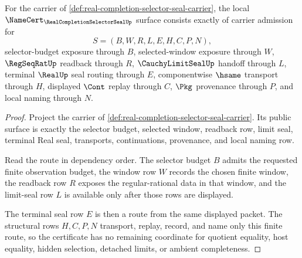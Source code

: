 \begin{theorem}
\label{thm:real-completion-selector-seal-namecert-obligations}
For the carrier of \autoref{def:real-completion-selector-seal-carrier}, the local $\NameCert_{\RealCompletionSelectorSealUp}$ surface consists exactly of carrier admission for
$$
S=(B,W,R,L,E,H,C,P,N),
$$
selector-budget exposure through $B$, selected-window exposure through $W$, $\RegSeqRatUp$ readback through $R$, $\CauchyLimitSealUp$ handoff through $L$, terminal $\RealUp$ seal routing through $E$, componentwise $\hsame$ transport through $H$, displayed $\Cont$ replay through $C$, $\Pkg$ provenance through $P$, and local naming through $N$.
\end{theorem}
\begin{proof}
Project the carrier of \autoref{def:real-completion-selector-seal-carrier}. Its public surface is exactly the selector budget, selected window, readback row, limit seal, terminal Real seal, transports, continuations, provenance, and local naming row.

Read the route in dependency order. The selector budget $B$ admits the requested finite observation budget, the window row $W$ records the chosen finite window, the readback row $R$ exposes the regular-rational data in that window, and the limit-seal row $L$ is available only after those rows are displayed.

The terminal seal row $E$ is then a route from the same displayed packet. The structural rows $H,C,P,N$ transport, replay, record, and name only this finite route, so the certificate has no remaining coordinate for quotient equality, host equality, hidden selection, detached limits, or ambient completeness.
\end{proof}

